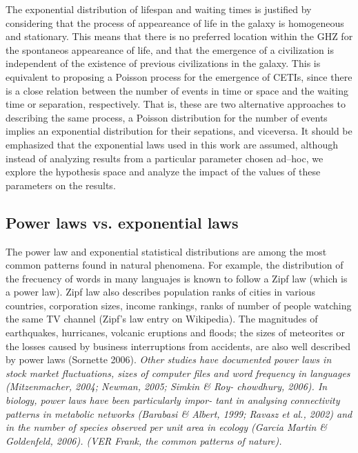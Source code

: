 \documentclass[useAMS,usenatbib]{mnras}
\begin{document}
The exponential distribution of lifespan and waiting times is
justified by considering that the process of appeareance of life in
the galaxy is homogeneous and stationary.
%
This means that there is no preferred location within the GHZ for the
spontaneos appeareance of life, and that the emergence of a
civilization is independent of the existence of previous civilizations 
in the galaxy.
%
This is equivalent to proposing a Poisson process for the emergence of
CETIs, since there is a close relation between the number of events in
time or space and the waiting time or separation, respectively.
%
That is, these are two alternative approaches to describing the same
process, a Poisson distribution for the number of events implies an
exponential distribution for their sepations, and viceversa.
%
It should be emphasized that the exponential laws used in this work
are assumed, although instead of analyzing results from a particular
parameter chosen ad--hoc, we explore the hypothesis space and analyze
the impact of the values of these parameters on the results.
%


\subsection{Power laws vs. exponential laws}

The power law and exponential statistical distributions are among the
most common patterns found in natural phenomena.
%
For example, the distribution of the frecuency of words in many
languajes is known to follow a Zipf law (which is a power law).
%
Zipf law also describes population ranks of cities in various
countries, corporation sizes, income rankings, ranks of number of
people watching the same TV channel (Zipf's law entry on Wikipedia).
%
The magnitudes of earthquakes, hurricanes, volcanic eruptions and
floods; the sizes of meteorites or the losses caused by
business interruptions from accidents, are also well described by power
laws (Sornette 2006).
%
\itshape
Other studies have
documented power laws in stock market fluctuations,
sizes of computer files and word frequency in languages
(Mitzenmacher, 2004; Newman, 2005; Simkin \& Roy-
chowdhury, 2006).
In biology, power laws have been particularly impor-
tant in analysing connectivity patterns in metabolic
networks (Barabasi \& Albert, 1999; Ravasz et al., 2002)
and in the number of species observed per unit area in
ecology (Garcia Martin \& Goldenfeld, 2006).
(VER Frank, the common patterns of nature).
\slshape
\end{document}
